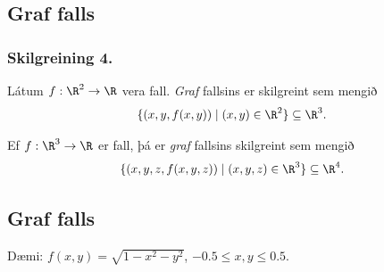 \date{14.~janúar 2015}



\subsection{}
	\maketitle





\subsection{Graf falls} 

\subsubsection{Skilgreining 4.}
Látum $f:\R^2\rightarrow \R$ vera fall.  {\em Graf} fallsins er skilgreint sem mengið 
$$\{(x,y,f(x,y))\mid (x,y)\in\R^2\}\subseteq \R^3.$$

Ef $f:\R^3\rightarrow \R$ er fall, þá er  {\em graf} fallsins skilgreint sem mengið 
$$\{(x,y,z,f(x,y,z))\mid (x,y,z)\in\R^3\}\subseteq \R^4.$$

            


\subsection{Graf falls}
 Dæmi: $f(x,y) = \sqrt{1-x^2-y^2}$, $-0.5\leq x,y\leq 0.5$.         

\begin{figure} [h]
\begin {center}  \end {center}
\end {figure}  



